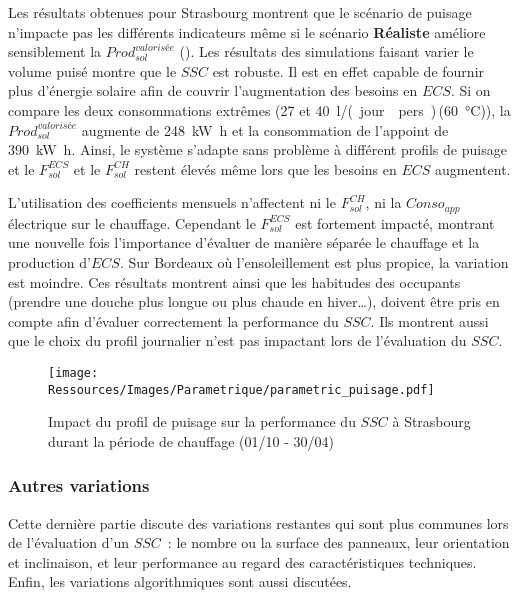 Les résultats obtenues pour Strasbourg montrent que le scénario de puisage n’impacte pas
les différents indicateurs même si le scénario \textbf{Réaliste} améliore sensiblement la
$Prod_{sol}^{valorisée}$ (). Les résultats des
simulations faisant varier le volume puisé montre que le $SSC$ est robuste. Il est en
effet capable de fournir plus d’énergie solaire afin de couvrir l’augmentation des besoins
en $ECS$. Si on compare les deux consommations extrêmes (\num{27} et
\SI{40}{\litre/(jour\period pers)}\,(\SI{60}{\celsius})), la $Prod_{sol}^{valorisée}$
augmente de \SI{248}{\kilo\watt\hour} et la consommation de l’appoint de \SI{390}{\kilo\watt\hour}.
Ainsi, le système s’adapte sans problème à différent profils de puisage et le
$F_{sol}^{ECS}$ et le $F_{sol}^{CH}$ restent élevés même lors que les besoins en $ECS$ augmentent.

L’utilisation des coefficients mensuels n’affectent ni le $F_{sol}^{CH}$, ni la $Conso_{app}$
électrique sur le chauffage. Cependant le $F_{sol}^{ECS}$ est fortement impacté, montrant une
nouvelle fois l’importance d’évaluer de manière séparée le chauffage et la production
d’$ECS$. Sur Bordeaux où l’ensoleillement est plus propice, la variation est moindre. Ces
résultats montrent ainsi que les habitudes des occupants (prendre une douche plus longue
ou plus chaude en hiver\dots), doivent être pris en compte afin d’évaluer correctement la
performance du $SSC$. Ils montrent aussi que le choix du profil journalier n’est pas impactant lors
de l’évaluation du $SSC$.

\begin{figure}
    \centering
    \texttt{[image: Ressources/Images/Parametrique/parametric\_puisage.pdf]}
    \caption{Impact du profil de puisage sur la performance
             du $SSC$ à Strasbourg durant la période de chauffage (01/10 - 30/04)
             \label{fig:impact_profil_puisage}}
\end{figure}


\subsubsection{Autres variations} %
\label{ssub:autres_variations}
Cette dernière partie discute des variations restantes qui sont plus communes lors
de l’évaluation d’un $SSC$~: le nombre ou la surface des panneaux, leur
orientation et inclinaison, et leur performance au regard des caractéristiques techniques.
Enfin, les variations algorithmiques sont aussi discutées.


